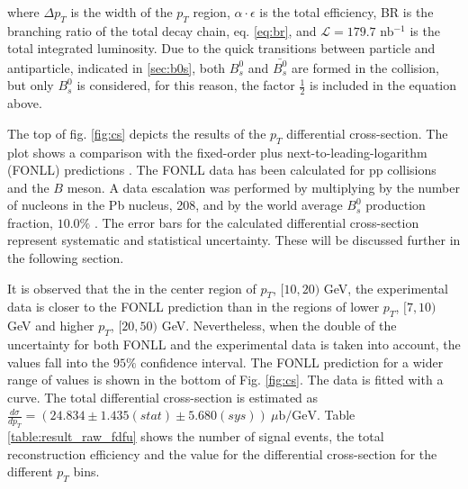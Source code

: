 where $\Delta p_T$ is the width of the $p_T$ region, $\alpha \cdot \epsilon$ is the total efficiency, BR is the branching ratio of the total decay chain, eq. \ref{eq:br}, and $\mathcal{L} = 179.7$ nb$^{-1}$  is the total integrated luminosity. Due to the quick transitions between particle and antiparticle, indicated in \ref{sec:b0s}, both $B^0_s$ and $\bar{B^0_s}$ are formed in the collision, but only $B^0_s$ is considered, for this reason, the factor $\frac{1}{2}$ is included in the equation above. 

The top of fig. \ref{fig:cs} depicts the results of the $p_T$ differential cross-section. The plot shows a comparison with the fixed-order plus next-to-leading-logarithm (FONLL) predictions \cite{FONLL}. The FONLL data has been calculated for pp collisions and the $B$ meson. A data escalation was performed by multiplying by the number of nucleons in the Pb nucleus, 208, and by the world average $B^{0}_s$ production fraction, $10.0 \%$ \cite{khachatryan2016study, pdgadmixture}. The error bars for the calculated differential cross-section represent systematic and statistical uncertainty. These will be discussed further in the following section.

It is observed that the in the center region of $p_T$, $[10, 20)$ GeV, the experimental data is closer to the FONLL prediction than in the regions of lower $p_T$, $[7, 10)$ GeV and higher $p_T$, $[20, 50)$ GeV. Nevertheless, when the double of the uncertainty for both FONLL and the experimental data is taken into account, the values fall into the $95\%$ \cite{vsirca2016probability} confidence interval. The FONLL prediction for a wider range of values is shown in the bottom of Fig. \ref{fig:cs}. The data is fitted with a curve. The total differential cross-section is estimated as $\frac{d \sigma}{dp_T} = (24.834 \pm 1.435(stat) \pm 5.680(sys)) \ \mu\text{b}/\text{GeV}$. Table \ref{table:result_raw_fdfu} shows the number of signal events, the total reconstruction efficiency and the value for the differential cross-section for the different $p_T$ bins.

